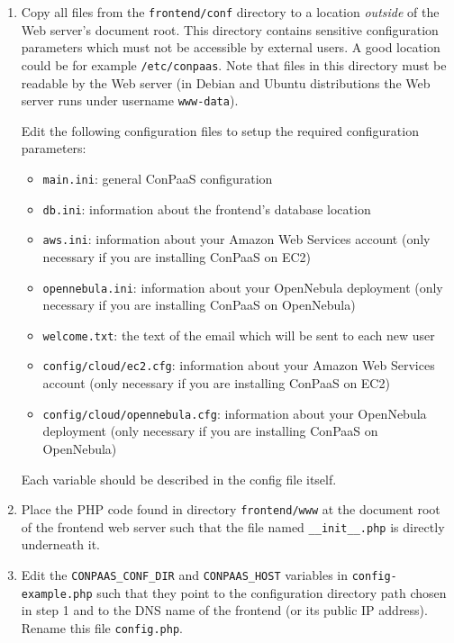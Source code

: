 \documentclass[10pt]{article}
\begin{document}
\begin{enumerate}
\item Copy all files from the \verb+frontend/conf+ directory to a
  location \emph{outside} of the Web server's document root.
  This directory contains sensitive configuration parameters which
  must not be accessible by external users. A good location could be
  for example \verb+/etc/conpaas+. Note that files in this
  directory must be readable by the Web server (in Debian and Ubuntu
  distributions the Web server runs under username \verb+www-data+).

  Edit the following configuration files to setup the required
  configuration parameters:
  \begin{itemize}
  \item \texttt{main.ini}: general ConPaaS configuration
  \item \texttt{db.ini}: information about the frontend's database location
  \item \texttt{aws.ini}: information about your Amazon Web Services
    account (only necessary if you are installing ConPaaS on EC2)
  \item \texttt{opennebula.ini}: information about your OpenNebula
    deployment (only necessary if you are installing ConPaaS on
    OpenNebula)
  \item \texttt{welcome.txt}: the text of the email which will be sent
    to each new user
  \item \texttt{config/cloud/ec2.cfg}: information about your Amazon
    Web Services account (only necessary if you are installing ConPaaS
    on EC2)
  \item \texttt{config/cloud/opennebula.cfg}: information about your
    OpenNebula deployment (only necessary if you are installing
    ConPaaS on OpenNebula)
  \end{itemize}

  Each variable should be described in the config file itself. 

\item Place the PHP code found in directory \verb+frontend/www+ at the
  document root of the frontend web server such that the file named
  \verb+__init__.php+ is directly underneath it.

\item Edit the \verb+CONPAAS_CONF_DIR+ and \verb+CONPAAS_HOST+ variables in
  \verb+config-example.php+ such that they point to the configuration
  directory path chosen in step 1 and to the DNS name of the frontend
  (or its public IP address). Rename this file \verb+config.php+.


\end{enumerate}
\end{document}
